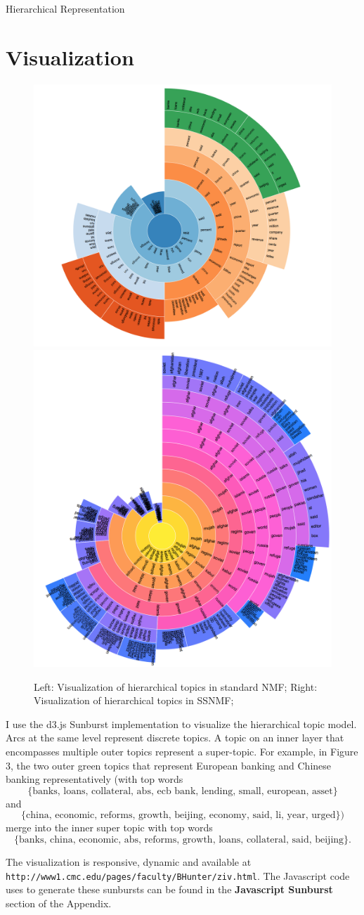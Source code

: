 \documentclass[12pt]{pom_thesis}
\begin{document}
\begin{chapter}{Hierarchical Representation}
\section{Visualization}
\begin{figure}
	\centering
	\includegraphics[width=.48\textwidth]{img}
	\includegraphics[width=.48\textwidth]{img2}
	\caption{Left: Visualization of hierarchical topics in standard NMF; Right: Visualization of hierarchical topics in  SSNMF; }
\end{figure}
I use the d3.js Sunburst implementation to visualize the hierarchical topic model. Arcs at the same level represent discrete topics. A topic on an inner layer that encompasses multiple outer topics represent a super-topic. For example, in Figure 3, the two outer green topics that represent European banking and Chinese banking representatively (with top words$$ \{\text{banks, loans, collateral, abs, ecb bank, lending, small, european, asset}\} $$and $$\{\text{china, economic, reforms, growth, beijing, economy, said, li, year, urged}\}) $$merge into the inner super topic with top words$$ \{\text{banks, china, economic, abs, reforms, growth, loans, collateral, said, beijing}\}.$$

The visualization is responsive, dynamic and available at \\ \texttt{http://www1.cmc.edu/pages/faculty/BHunter/ziv.html}. The Javascript code uses to generate these sunbursts can be found in the \textbf{Javascript Sunburst} section of the Appendix.


\end{chapter}
\end{document}

